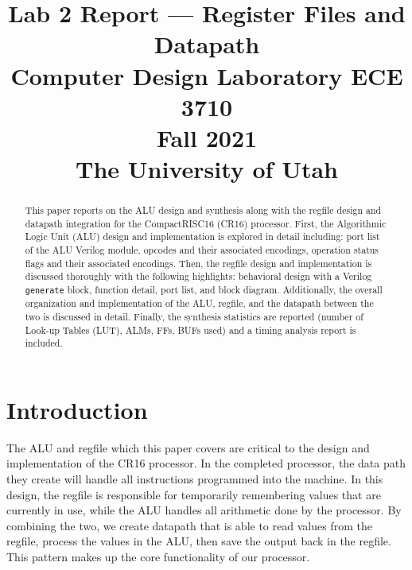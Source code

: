 \documentclass[conference]{IEEEtran}
\begin{document}
\title{Lab 2 Report --- Register Files and Datapath\\
\Large{Computer Design Laboratory ECE 3710}\\
\Large{Fall 2021}\\
\Large{The University of Utah}}

\author{
\and
{}
\and
{}
\and
{}
}

\maketitle

\begin{abstract}
This paper reports on the ALU design and synthesis along with the regfile design and datapath integration for the CompactRISC16 (CR16) processor. First, the Algorithmic Logic Unit (ALU) design and implementation is explored in detail including: port list of the ALU Verilog module, opcodes and their associated encodings, operation status flags and their associated encodings. Then, the regfile design and implementation is discussed thoroughly with the following highlights: behavioral design with a Verilog \verb|generate| block, function detail, port list, and block diagram. Additionally, the overall organization and implementation of the ALU, regfile, and the datapath between the two is discussed in detail. Finally, the synthesis statistics are reported (number of Look-up Tables (LUT), ALMs, FFs, BUFs used) and a timing analysis report is included.
\end{abstract}

\section{Introduction}
The ALU and regfile which this paper covers are critical to the design and implementation of the CR16 processor. In the completed processor, the data path they create will handle all instructions programmed into the machine. In this design, the regfile is responsible for temporarily remembering values that are currently in use, while the ALU handles all arithmetic done by the processor. By combining the two, we create datapath that is able to read values from the regfile, process the values in the ALU, then save the output back in the regfile. This pattern makes up the core functionality of our processor.
\end{document}
